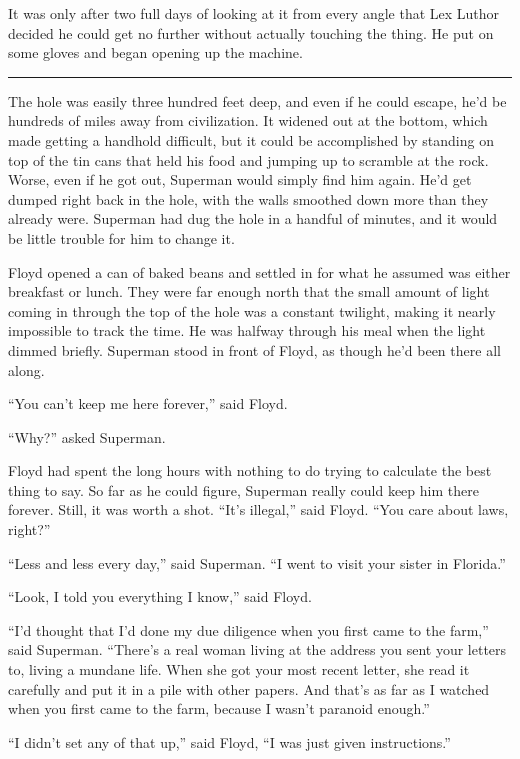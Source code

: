 \documentclass[ebook,12pt]{memoir}
\begin{document}
It was only after two full days of looking at it from every angle that
Lex Luthor decided he could get no further without actually touching the
thing. He put on some gloves and began opening up the machine.

\begin{center}\rule{0.5\linewidth}{0.5pt}\end{center}

The hole was easily three hundred feet deep, and even if he could
escape, he'd be hundreds of miles away from civilization. It widened out
at the bottom, which made getting a handhold difficult, but it could be
accomplished by standing on top of the tin cans that held his food and
jumping up to scramble at the rock. Worse, even if he got out, Superman
would simply find him again. He'd get dumped right back in the hole,
with the walls smoothed down more than they already were. Superman had
dug the hole in a handful of minutes, and it would be little trouble for
him to change it.

Floyd opened a can of baked beans and settled in for what he assumed was
either breakfast or lunch. They were far enough north that the small
amount of light coming in through the top of the hole was a constant
twilight, making it nearly impossible to track the time. He was halfway
through his meal when the light dimmed briefly. Superman stood in front
of Floyd, as though he'd been there all along.

``You can't keep me here forever,'' said Floyd.

``Why?'' asked Superman.

Floyd had spent the long hours with nothing to do trying to calculate
the best thing to say. So far as he could figure, Superman really could
keep him there forever. Still, it was worth a shot. ``It's illegal,''
said Floyd. ``You care about laws, right?''

``Less and less every day,'' said Superman. ``I went to visit your
sister in Florida.''

``Look, I told you everything I know,'' said Floyd.

``I'd thought that I'd done my due diligence when you first came to the
farm,'' said Superman. ``There's a real woman living at the address you
sent your letters to, living a mundane life. When she got your most
recent letter, she read it carefully and put it in a pile with other
papers. And that's as far as I watched when you first came to the farm,
because I wasn't paranoid enough.''

``I didn't set any of that up,'' said Floyd, ``I was just given
instructions.''
\end{document}
